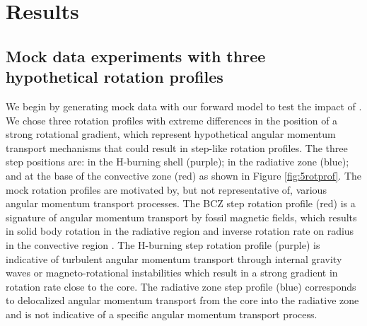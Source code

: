 \section{Results}
\label{sec:results}

\subsection{Mock data experiments with three hypothetical rotation profiles}
\label{sec:prof}

We begin by generating mock data with our forward model to test the impact of . We chose three rotation profiles with extreme differences in the position of a strong rotational gradient, which represent hypothetical angular momentum transport mechanisms that could result in step-like rotation profiles. The three step positions are: in the H-burning shell (purple); in the radiative zone (blue); and at the base of the convective zone (red) as shown in Figure \ref{fig:5rotprof}. The mock rotation profiles are motivated by, but not representative of, various angular momentum transport processes. The BCZ step rotation profile (red) is a signature of angular momentum transport by fossil magnetic fields, which results in solid body rotation in the radiative region and inverse rotation rate on radius in the convective region \citep{kissin_rotation_2015, takahashi_modeling_2021}. The H-burning step rotation profile (purple) is indicative of turbulent angular momentum transport through internal gravity waves \citep{pincon_can_2017} or magneto-rotational instabilities \citep{spada_angular_2016,balbus_stability_1994,arlt_differential_2003,menou_magnetorotational_2006} which result in a strong gradient in rotation rate close to the core. The radiative zone step profile (blue) corresponds to delocalized angular momentum transport from the core into the radiative zone and is not indicative of a specific angular momentum transport process.




